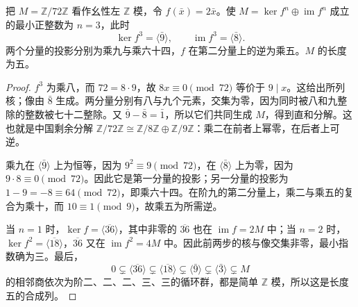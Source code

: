 \begin{proposition}\label{b2:prop:fitting-integer-projections}
	把 \(M=\mathbb Z/72\mathbb Z\) 看作幺性左 \(\mathbb Z\) 模，令 \(f(\bar x)=2\bar x\)。使 \(M=\ker f^n\oplus\operatorname{im}f^n\) 成立的最小正整数为 \(n=3\)，此时
	\[
		\ker f^3=\langle\bar9\rangle,\qquad \operatorname{im}f^3=\langle\bar8\rangle.
	\]
	两个分量的投影分别为乘九与乘六十四，\(f\) 在第二分量上的逆为乘五。\(M\) 的长度为五。
\end{proposition}
\begin{proof}
	\(f^3\) 为乘八，而 \(72=8\cdot9\)，故 \(8x\equiv0\pmod{72}\) 等价于 \(9\mid x\)。这给出所列核；像由 \(\bar8\) 生成。两分量分别有八与九个元素，交集为零，因为同时被八和九整除的整数被七十二整除。又 \(\bar9-\bar8=\bar1\)，所以它们共同生成 \(M\)，得到直和分解。这也就是中国剩余分解 \(\mathbb Z/72\mathbb Z\cong\mathbb Z/8\mathbb Z\oplus\mathbb Z/9\mathbb Z\)：乘二在前者上幂零，在后者上可逆。

	乘九在 \(\langle\bar9\rangle\) 上为恒等，因为 \(9^2\equiv9\pmod{72}\)，在 \(\langle\bar8\rangle\) 上为零，因为 \(9\cdot8\equiv0\pmod{72}\)。因此它是第一分量的投影；另一分量的投影为 \(1-9=-8\equiv64\pmod{72}\)，即乘六十四。在阶九的第二分量上，乘二与乘五的复合为乘十，而 \(10\equiv1\pmod9\)，故乘五为所需逆。

	当 \(n=1\) 时，\(\ker f=\langle\overline{36}\rangle\)，其中非零的 \(\overline{36}\) 也在 \(\operatorname{im}f=2M\) 中；当 \(n=2\) 时，\(\ker f^2=\langle\overline{18}\rangle\)，\(\overline{36}\) 又在 \(\operatorname{im}f^2=4M\) 中。因此前两步的核与像交集非零，最小指数确为三。最后，
	\[
		0\subsetneq\langle\overline{36}\rangle \subsetneq\langle\overline{18}\rangle \subsetneq\langle\bar9\rangle \subsetneq\langle\bar3\rangle \subsetneq M
	\]
	的相邻商依次为阶二、二、二、三、三的循环群，都是简单 \(\mathbb Z\) 模，所以这是长度五的合成列。
\end{proof}

